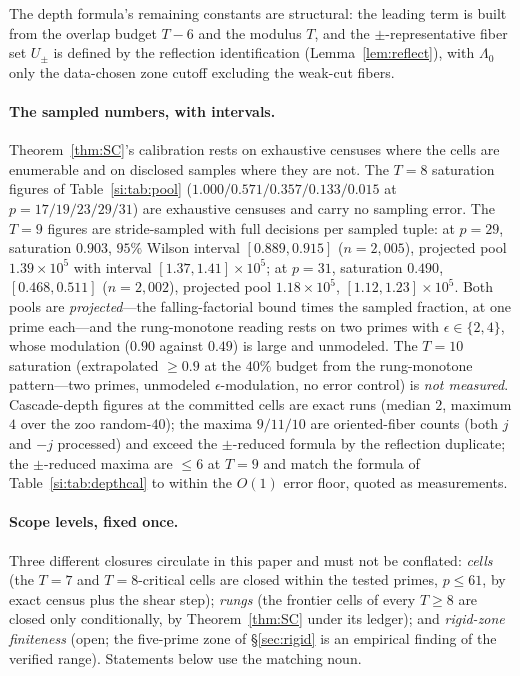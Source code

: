 \documentclass[11pt,a4paper]{article}
\numberwithin{equation}{section}
\theoremstyle{plain}
\theoremstyle{plain}
\theoremstyle{definition}
\theoremstyle{remark}
\begin{document}
The depth formula's remaining constants are structural: the leading
term is built from the overlap budget $T-6$ and the modulus $T$, and the
$\pm$-representative fiber set $U_\pm$ is defined by the reflection
identification (Lemma~\ref{lem:reflect}), with $\Lambda_0$ only the
data-chosen zone cutoff excluding the weak-cut fibers.

\paragraph{The sampled numbers, with intervals.}
Theorem~\ref{thm:SC}'s calibration rests on exhaustive censuses where
the cells are enumerable and on disclosed samples where they are not.
The $T=8$ saturation figures of Table~\ref{si:tab:pool}
($1.000/0.571/0.357/0.133/0.015$ at $p=17/19/23/29/31$) are exhaustive
censuses and carry no sampling error. The $T=9$ figures are
stride-sampled with full decisions per sampled tuple: at $p=29$,
saturation $0.903$, $95\%$ Wilson interval $[0.889,0.915]$
($n=2{,}005$), projected pool $1.39\times10^5$ with interval
$[1.37,1.41]\times10^5$; at $p=31$, saturation $0.490$,
$[0.468,0.511]$ ($n=2{,}002$), projected pool $1.18\times10^5$,
$[1.12,1.23]\times10^5$. Both pools are \emph{projected}---the
falling-factorial bound times the sampled fraction, at one prime
each---and the rung-monotone reading rests on two primes with
$\epsilon\in\{2,4\}$, whose modulation ($0.90$ against $0.49$) is large
and unmodeled. The $T=10$ saturation (extrapolated $\ge 0.9$ at the
$40\%$ budget from the rung-monotone pattern---two primes, unmodeled
$\epsilon$-modulation, no error control) is \emph{not measured}. Cascade-depth figures at the
committed cells are exact runs (median $2$, maximum $4$ over the zoo
random-$40$); the maxima $9/11/10$ are oriented-fiber counts (both $j$
and $-j$ processed) and exceed the $\pm$-reduced formula by the reflection
duplicate; the $\pm$-reduced maxima are $\le 6$ at $T=9$ and match the
formula of Table~\ref{si:tab:depthcal} to within the $O(1)$ error floor,
quoted as measurements.

\paragraph{Scope levels, fixed once.}
Three different closures circulate in this paper and must not be
conflated: \emph{cells} (the $T=7$ and $T=8$-critical cells are closed
within the tested primes, $p\le 61$, by exact census plus the shear
step); \emph{rungs} (the frontier cells of every $T\ge 8$ are closed
only conditionally, by Theorem~\ref{thm:SC} under its ledger); and
\emph{rigid-zone finiteness} (open; the five-prime zone of
\S\ref{sec:rigid} is an empirical finding of the verified range).
Statements below use the matching noun.
\end{document}

